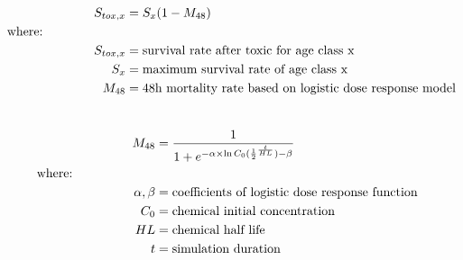 \documentclass[12pt]{article}
\begin{document}
\begin{align}
S_{tox, x} &=S_{x}(1-M_{48}) \nonumber \\
&    \hspace{-1.3in}  \text{where:} \nonumber \\
S_{tox, x} &= \text{survival rate after toxic for age class x }\nonumber \\
S_{x} &= \text{maximum survival rate of age class x} \nonumber \\
M_{48} &= \text{48h mortality rate based on logistic dose response model}\nonumber
\end{align}
 
\begin{align}
&    \hspace{-1.3in}  \text{} \nonumber \\
M_{48} &= \frac{1}{1+e^{-\alpha \times \ln C_{0}(\frac{1}{2}^{\frac{t}{HL}}) - \beta}} \nonumber \\
&    \hspace{-1.3in}  \text{where:} \nonumber \\
\alpha, \beta &= \text{coefficients of logistic dose response function}\nonumber \\
C_{0} &= \text{chemical initial concentration} \nonumber \\
HL &= \text{chemical half life}\nonumber \\
t &= \text{simulation duration}\nonumber
\end{align} 
\end{document}
